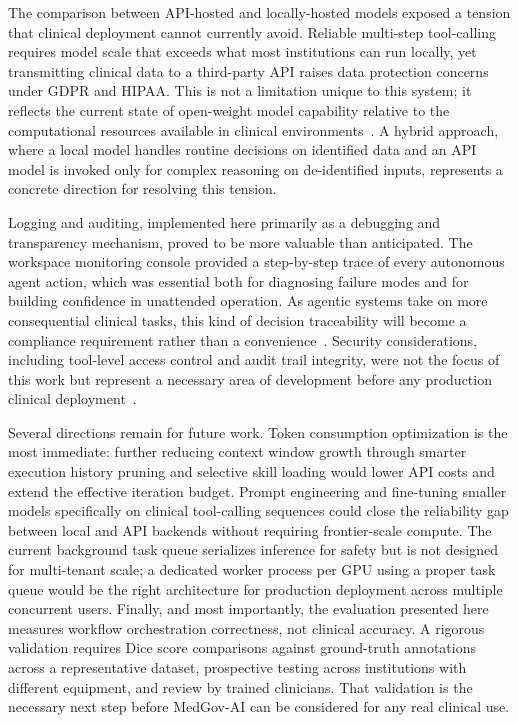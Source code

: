 \documentclass[conference]{IEEEtran}
\begin{document}
The comparison between API-hosted and locally-hosted models exposed a tension that clinical deployment cannot currently avoid. Reliable multi-step tool-calling requires model scale that exceeds what most institutions can run locally, yet transmitting clinical data to a third-party API raises data protection concerns under GDPR and HIPAA. This is not a limitation unique to this system; it reflects the current state of open-weight model capability relative to the computational resources available in clinical environments~\cite{agiformedicalimaging2025}. A hybrid approach, where a local model handles routine decisions on identified data and an API model is invoked only for complex reasoning on de-identified inputs, represents a concrete direction for resolving this tension.

Logging and auditing, implemented here primarily as a debugging and transparency mechanism, proved to be more valuable than anticipated. The workspace monitoring console provided a step-by-step trace of every autonomous agent action, which was essential both for diagnosing failure modes and for building confidence in unattended operation. As agentic systems take on more consequential clinical tasks, this kind of decision traceability will become a compliance requirement rather than a convenience~\cite{trustworthyai2025, dietrich2025agentic}. Security considerations, including tool-level access control and audit trail integrity, were not the focus of this work but represent a necessary area of development before any production clinical deployment~\cite{transformingclinical2026}.

Several directions remain for future work. Token consumption optimization is the most immediate: further reducing context window growth through smarter execution history pruning and selective skill loading would lower API costs and extend the effective iteration budget. Prompt engineering and fine-tuning smaller models specifically on clinical tool-calling sequences could close the reliability gap between local and API backends without requiring frontier-scale compute. The current background task queue serializes inference for safety but is not designed for multi-tenant scale; a dedicated worker process per GPU using a proper task queue would be the right architecture for production deployment across multiple concurrent users. Finally, and most importantly, the evaluation presented here measures workflow orchestration correctness, not clinical accuracy. A rigorous validation requires Dice score comparisons against ground-truth annotations across a representative dataset, prospective testing across institutions with different equipment, and review by trained clinicians. That validation is the necessary next step before MedGov-AI can be considered for any real clinical use.
\end{document}
